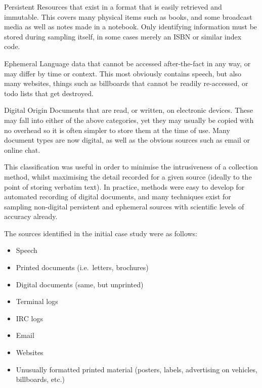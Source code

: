 \begin{itemizeTitle}
    \item[Persistent] Resources that exist in a format that is easily retrieved and immutable.  This covers many physical items such as books, and some broadcast media as well as notes made in a notebook.  Only identifying information must be stored during sampling itself, in some cases merely an ISBN or similar index code.
    \item[Ephemeral] Language data that cannot be accessed after-the-fact in any way, or may differ by time or context.  This most obviously contains speech, but also many websites, things such as billboards that cannot be readily re-accessed, or todo lists that get destroyed.
    \item[Digital Origin] Documents that are read, or written, on electronic devices.  These may fall into either of the above categories, yet they may usually be copied with no overhead so it is often simpler to store them at the time of use.  Many document types are now digital, as well as the obvious sources such as email or online chat.
\end{itemizeTitle}

This classification was useful in order to minimise the intrusiveness of a collection method, whilst maximising the detail recorded for a given source (ideally to the point of storing verbatim text).  In practice, methods were easy to develop for automated recording of digital documents, and many techniques exist for sampling non-digital persistent and ephemeral sources with scientific levels of accuracy already.

The sources identified in the initial case study were as follows:

\begin{itemize}
    \item Speech
    \item Printed documents (i.e.\ letters, brochures)
    \item Digital documents (same, but unprinted)
    \item Terminal logs
    \item IRC logs
    \item Email
    \item Websites
    \item Unusually formatted printed material (posters, labels, advertising on vehicles, billboards, etc.)
\end{itemize}

